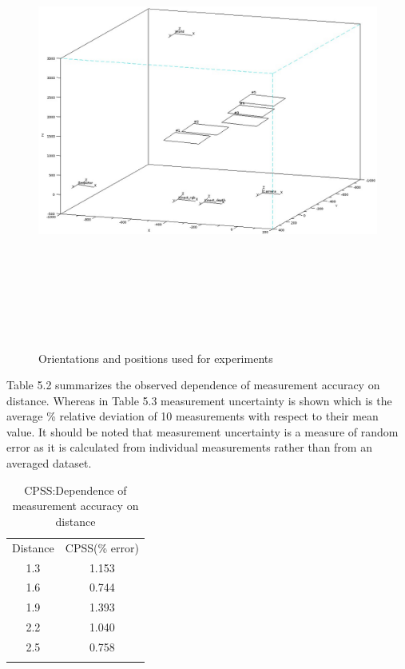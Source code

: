 \begin{figure}[ht]
\centering
\includegraphics[width=17cm,height=15cm]{../img_source/experiment_plot.jpg}
\caption{Orientations and positions used for experiments}
\label{fig:experiment_plot}
\end{figure}


Table 5.2 summarizes the observed dependence of measurement accuracy on distance. Whereas in Table 5.3 measurement uncertainty is shown which is the average \% relative deviation of 10 measurements with respect to their mean value. It should be noted that measurement uncertainty is a measure of random error as it is calculated from individual measurements rather than from an averaged dataset. 

\begin{table}[ht]
\centering
\label{table:accuracy}
\begin{tabular}{c c}
\hline\noalign{\smallskip}
Distance & CPSS(\% error) \\
\noalign{\smallskip}\hline\noalign{\smallskip}
1.3 & 1.153  \\
1.6 & 0.744    \\
1.9 & 1.393    \\
2.2 & 1.040    \\
2.5 & 0.758    \\
\noalign{\smallskip}\hline
\end{tabular}
\caption{CPSS:Dependence of measurement accuracy on distance}
\end{table}

